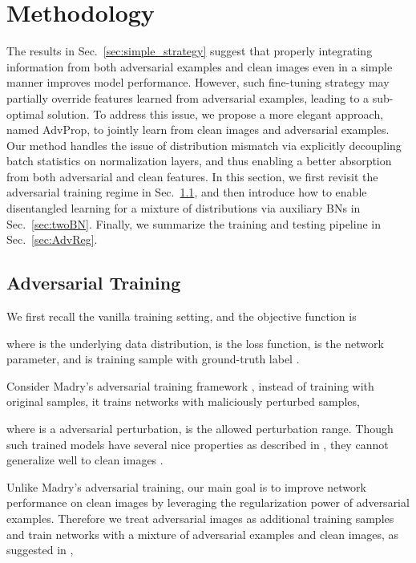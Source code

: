 \documentclass[10pt,twocolumn,letterpaper]{article}
\begin{document}
\section{Methodology}
The results in Sec.~\ref{sec:simple_strategy} suggest that properly integrating information from both adversarial examples and clean images even in a simple manner improves model performance. However, such fine-tuning strategy may partially override features learned from adversarial examples, leading to a sub-optimal solution.
To address this issue, we propose a more elegant approach, named AdvProp,
to jointly learn from clean images and adversarial examples. Our method handles the issue of distribution mismatch via explicitly decoupling batch statistics on normalization layers, and thus enabling a better absorption from both adversarial and clean features. In this section, we first revisit the adversarial training regime in Sec.~\ref{Sec:advTrain}, and then introduce how to enable disentangled learning for a mixture of distributions via auxiliary BNs in Sec.~\ref{sec:twoBN}. Finally, we summarize the training and testing pipeline in Sec.~\ref{sec:AdvReg}. 


\subsection{Adversarial Training}
\label{Sec:advTrain}
We first recall the vanilla training setting, and the objective function is

where  is the underlying data distribution,   is the loss function,  is the network parameter, and  is training sample with ground-truth label . 

Consider Madry's adversarial training framework \cite{Madry2018}, instead of training with original samples, it trains networks with maliciously perturbed samples, 

where  is a adversarial perturbation,  is the allowed perturbation range. Though such trained models have several nice properties as described in \cite{Zhang2019c,Yin2019,Tsipras2018}, they cannot generalize well to clean images \cite{Madry2018,Xie2019}.


Unlike Madry's adversarial training, our main goal is to improve network performance on clean images by leveraging the regularization power of adversarial examples. Therefore we treat adversarial images as additional training samples and train networks with a mixture of adversarial examples and clean images, as suggested in \cite{Goodfellow2015,Kurakin2017},  
\end{document}
